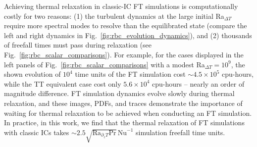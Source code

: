 \documentclass[aps, pre, onecolumn, nofootinbib, notitlepage, groupedaddress, amsfonts, amssymb, amsmath, longbibliography, superscriptaddress]{revtex4-1}
\begin{document}
Achieving thermal relaxation in classic-IC FT simulations is computationally costly for two reasons: (1) the turbulent dynamics at the large initial Ra$_{\Delta T}$ require more spectral modes to resolve than the equilibrated state (compare the left and right dynamics in Fig.~\ref{fig:rbc_evolution_dynamics}), and (2) thousands of freefall times must pass during relaxation (see Fig.~\ref{fig:rbc_scalar_comparisons}).
For example, for the cases displayed in the left panels of Fig.~\ref{fig:rbc_scalar_comparisons} with a modest Ra$_{\Delta T} = 10^9$, the shown evolution of $10^4$ time units of the FT simulation cost $\sim 4.5 \times 10^5$ cpu-hours, while the TT equivalent case cost only $5.6 \times 10^4$ cpu-hours -- nearly an order of magnitude difference.
FT simulation dynamics evolve slowly during thermal relaxation, and these images, PDFs, and traces demonstrate the importance of waiting for thermal relaxation to be achieved when conducting an FT simulation.
In practice, in this work, we find that the thermal relaxation of FT simulations with classic ICs takes $\sim 2.5\sqrt{\text{Ra}_{\partial_z T} \text{Pr}}\,\text{Nu}^{-1}$ simulation freefall time units.
\end{document}
